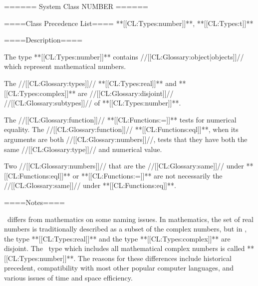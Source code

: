 ====== System Class NUMBER ======

====Class Precedence List==== **[[CL:Types:number]]**, **[[CL:Types:t]]**

====Description====


The type **[[CL:Types:number]]** contains //[[CL:Glossary:object|objects]]// which represent mathematical numbers.

The //[[CL:Glossary:types]]// **[[CL:Types:real]]** and **[[CL:Types:complex]]** are //[[CL:Glossary:disjoint]]// //[[CL:Glossary:subtypes]]// of **[[CL:Types:number]]**.

The //[[CL:Glossary:function]]// **[[CL:Functions:=]]** tests for numerical equality. The //[[CL:Glossary:function]]// **[[CL:Functions:eql]]**, when its arguments are both //[[CL:Glossary:numbers]]//, tests that they have both the same //[[CL:Glossary:type]]// and numerical value.

Two //[[CL:Glossary:numbers]]// that are the //[[CL:Glossary:same]]// under **[[CL:Functions:eql]]** or **[[CL:Functions:=]]** are not necessarily the //[[CL:Glossary:same]]// under **[[CL:Functions:eq]]**.

====Notes====

\clisp\ differs from mathematics on some naming issues. In mathematics, the set of real numbers is traditionally described as a subset of the complex numbers, but in \clisp, the type **[[CL:Types:real]]** and the type **[[CL:Types:complex]]** are disjoint. The \clisp\ type which includes all mathematical complex numbers is called **[[CL:Types:number]]**. The reasons for these differences include historical precedent, compatibility with most other popular computer languages, and various issues of time and space efficiency.

